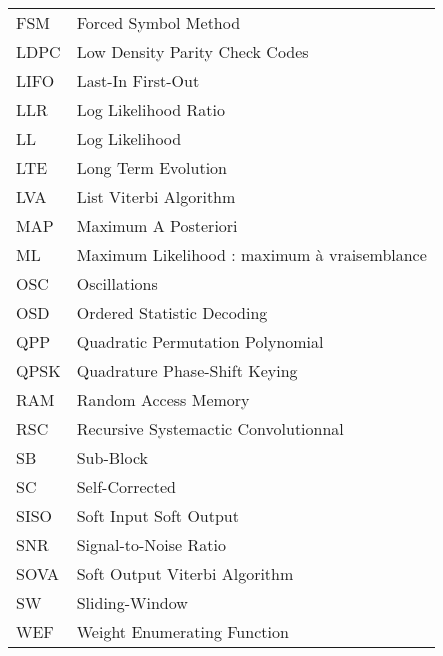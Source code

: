 \begin{center}
\begin{longtable}{ p{}  p{} }
FSM 		&   Forced Symbol Method																				\\
LDPC 		& 	Low Density Parity Check Codes	 																	\\
LIFO 		& 	Last-In First-Out																					\\
LLR 		&  	Log Likelihood Ratio	 																			\\
LL 	 		&  	Log Likelihood	 																			\\
LTE			& 	Long Term Evolution 																				\\
LVA			&	List Viterbi Algorithm	 																			\\
MAP			&   Maximum A Posteriori 																				\\
ML			&   Maximum Likelihood : maximum à vraisemblance 														\\
OSC			& 	Oscillations																						\\
OSD			& 	Ordered Statistic Decoding 																			\\
QPP			& 	Quadratic Permutation Polynomial	 																\\
QPSK		&	Quadrature Phase-Shift Keying																		\\
RAM			& 	Random Access Memory																				\\
RSC			& 	Recursive Systemactic Convolutionnal																\\
SB			&	Sub-Block																							\\
SC			&   Self-Corrected																						\\
SISO		&   Soft Input Soft Output																				\\
SNR			&	Signal-to-Noise Ratio																				\\
SOVA		&	Soft Output Viterbi Algorithm																		\\
SW			&	Sliding-Window																						\\
WEF			&   Weight Enumerating Function 																		\\


\end{longtable}

\end{center}

